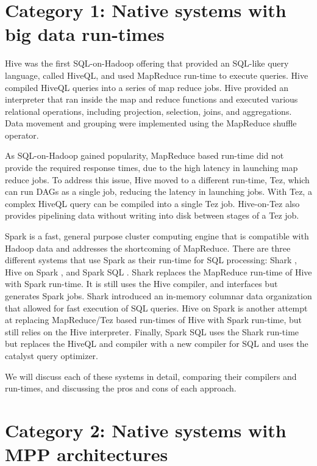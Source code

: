 \documentclass{vldb}
\begin{document}
\section{Category 1: Native systems with big data run-times}

Hive \cite{hive} was the first SQL-on-Hadoop offering that provided an SQL-like query language, called HiveQL, and used MapReduce run-time to execute queries. Hive compiled HiveQL queries into a series of map reduce jobs. Hive provided an interpreter that ran inside the map and reduce functions and executed various relational operations, including projection, selection, joins, and aggregations. Data movement and grouping were implemented using the MapReduce shuffle operator.

As SQL-on-Hadoop gained popularity, MapReduce based run-time did not provide the required response times, due to the high latency in launching map reduce jobs. To address this issue, Hive moved to a different run-time, Tez, which can run DAGs as a single job, reducing the latency in launching jobs. With Tez, a complex HiveQL query can be compiled into a single Tez job. Hive-on-Tez also provides pipelining data without writing into disk between stages of a Tez job.

Spark is a fast, general purpose cluster computing engine that is compatible with Hadoop data and addresses the shortcoming of MapReduce. There are three different systems that use Spark as their run-time for SQL processing: Shark \cite{sharksigmod13}, Hive on Spark \cite{hiveOnSpark}, and Spark SQL \cite{sparkSQL}. Shark replaces the MapReduce run-time of Hive \cite{hive} with Spark run-time. It is still uses the Hive compiler, and interfaces but generates Spark jobs. Shark introduced an in-memory columnar data organization that allowed for fast execution of SQL queries. Hive on Spark is another attempt at replacing MapReduce/Tez based run-times of Hive with Spark run-time, but still relies on the Hive interpreter. Finally, Spark SQL uses the Shark \cite{sharksigmod13} run-time but replaces the HiveQL and compiler with a new compiler for SQL and uses the catalyst query optimizer.

We will discuss each of these systems in detail, comparing their compilers and run-times, and discussing the pros and cons of each approach.


\section{Category 2: Native systems with MPP architectures}
\end{document}
